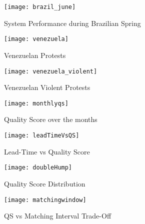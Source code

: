 %
\begin{figure*}
\centering
\begin{subfigure}{.5\textwidth}
  \centering
  \texttt{[image: brazil\_june]}
  \caption{System Performance during Brazilian Spring}
  \label{fig:brazil_june}
\end{subfigure}%
\begin{subfigure}{.5\textwidth}
  \centering
  \texttt{[image: venezuela]}
  \caption{Venezuelan Protests}
  \label{fig:venezuela_feb}
\end{subfigure}
\begin{subfigure}{.5\textwidth}
  \centering
  \texttt{[image: venezuela\_violent]}
  \caption{Venezuelan Violent Protests}
  \label{fig:venezuela_violent}
\end{subfigure}%
\begin{subfigure}{.5\textwidth}
  \centering
  \texttt{[image: monthlyqs]}
  \caption{Quality Score over the months}
  \label{fig:monthlyqs}
\end{subfigure}
\begin{subfigure}{.5\textwidth}
  \centering
  \texttt{[image: leadTimeVsQS]}
  \caption{Lead-Time vs Quality Score}
  \label{fig:leadTimeVsQS}
\end{subfigure}%
\begin{subfigure}{.5\textwidth}
  \centering
  \texttt{[image: doubleHump]}
  \caption{Quality Score Distribution}
  \label{fig:doubleHump}
\end{subfigure}
\begin{subfigure}{.5\textwidth}
  \centering
  \texttt{[image: matchingwindow]}
  \caption{QS vs Matching Interval Trade-Off}
  \label{fig:matchinginterval}
\end{subfigure}%
\end{figure*}


